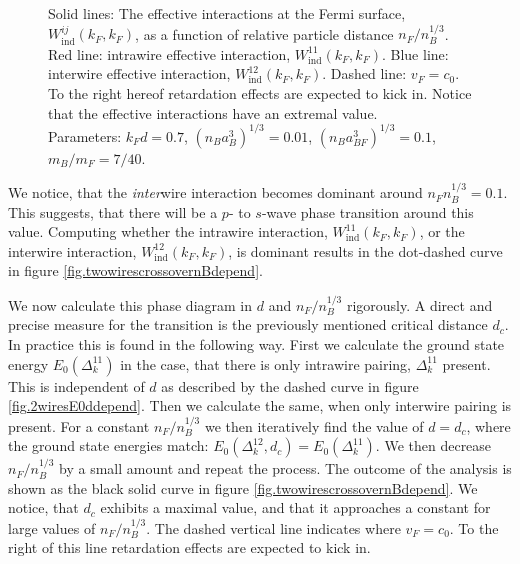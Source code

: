 \begin{figure} 
\begin{center}  
  
\caption{Solid lines: The effective interactions at the Fermi surface, $W^{ij}_{\text{ind}}(k_F,k_F)$, as a function of relative particle distance $n_F/n_B^{1/3}$. Red line: intrawire effective interaction, $W^{11}_{\text{ind}}(k_F,k_F)$. Blue line: interwire effective interaction, $W^{12}_{\text{ind}}(k_F,k_F)$. Dashed line: $v_F = c_0$. To the right hereof retardation effects are expected to kick in. Notice that the effective interactions have an extremal value. \\
Parameters: $k_Fd = 0.7$, $(n_Ba_B^3)^{1/3} = 0.01$, $(n_Ba_{BF}^3)^{1/3} = 0.1$, $m_B / m_F = 7/40$.}  
\label{fig.EffectiveInteraction.nBdepend}  
\end{center}    
\end{figure}

We notice, that the \textit{inter}wire interaction becomes dominant around $n_Fn_B^{1/3} = 0.1$. This suggests, that there will be a $p$- to $s$-wave phase transition around this value. Computing whether the intrawire interaction, $W^{11}_{\text{ind}}(k_F,k_F)$, or the interwire interaction, $W^{12}_{\text{ind}}(k_F,k_F)$, is dominant results in the dot-dashed curve in figure \ref{fig.twowirescrossovernBdepend}. 

We now calculate this phase diagram in $d$ and $n_F/n_B^{1/3}$ rigorously. A direct and precise measure for the transition is the previously mentioned critical distance $d_c$. In practice this is found in the following way. First we calculate the ground state energy $E_0(\Delta^{11}_k)$ in the case, that there is only intrawire pairing, $\Delta^{11}_k$ present. This is independent of $d$ as described by the dashed curve in figure \ref{fig.2wiresE0ddepend}. Then we calculate the same, when only interwire pairing is present. For a constant $n_F/n_B^{1/3}$ we then iteratively find the value of $d = d_c$, where the ground state energies match: $E_0(\Delta^{12}_k, d_c) = E_0(\Delta^{11}_k)$. We then decrease $n_F/n_B^{1/3}$ by a small amount and repeat the process. The outcome of the analysis is shown as the black solid curve in figure \ref{fig.twowirescrossovernBdepend}. We notice, that $d_c$ exhibits a maximal value, and that it approaches a constant for large values of $n_F/n_B^{1/3}$. The dashed vertical line indicates where $v_F = c_0$. To the right of this line retardation effects are expected to kick in. 

